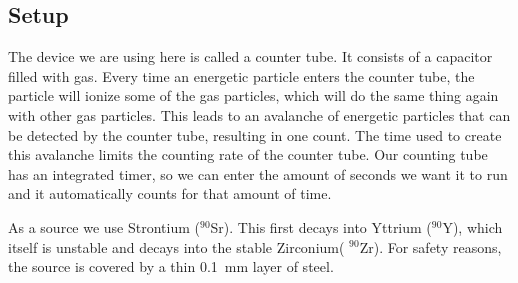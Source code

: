 \subsection{Setup}
The device we are using here is called a counter tube.
It consists of a capacitor filled with gas.
Every time an energetic particle enters the counter tube, the particle will ionize some of the gas particles, which will do the same thing again with other gas particles.
This leads to an avalanche of energetic particles that can be detected by the counter tube, resulting in one count. 
The time used to create this avalanche limits the counting rate of the counter tube.
Our counting tube has an integrated timer, so we can enter the amount of seconds we want it to run and it automatically counts for that amount of time.

As a source we use Strontium ($^{90}$Sr).
This first decays into Yttrium ($^{90}$Y), which itself is unstable and decays into the stable Zirconium( $^{90}$Zr).
For safety reasons, the source is covered by a thin \SI{0.1}{\milli\meter} layer of steel. 

